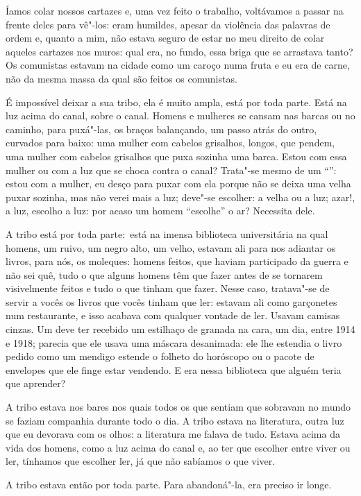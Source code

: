Íamos colar nossos cartazes e, uma vez feito o trabalho, voltávamos a
passar na frente deles para vê"-los: eram humildes, apesar da violência
das palavras de ordem e, quanto a mim, não estava seguro de estar no meu
direito de colar aqueles cartazes nos muros: qual era, no fundo, essa
briga que se arrastava tanto? Os comunistas estavam na cidade como um
caroço numa fruta e eu era de carne, não da mesma massa da qual são
feitos os comunistas.

É impossível deixar a sua tribo, ela é muito ampla, está por toda parte.
Está na luz acima do canal, sobre o canal. Homens e mulheres se cansam
nas barcas ou no caminho, para puxá"-las, os braços balançando, um passo
atrás do outro, curvados para baixo: uma mulher com cabelos grisalhos,
longos, que pendem, uma mulher com cabelos grisalhos que puxa sozinha
uma barca. Estou com essa mulher ou com a luz que se choca contra o
canal? Trata"-se mesmo de um ``'': estou com a mulher, eu desço para
puxar com ela porque não se deixa uma velha puxar sozinha, mas não verei
mais a luz; deve"-se escolher: a velha ou a luz; azar!, a luz, escolho a
luz: por acaso um homem ``escolhe'' o ar? Necessita dele.

A tribo está por toda parte:~está na imensa biblioteca universitária na
qual homens, um ruivo, um negro alto, um velho, estavam ali para nos
adiantar os livros, para nós, os moleques: homens feitos, que haviam
participado da guerra e não sei quê, tudo o que alguns homens têm que
fazer antes de se tornarem visivelmente feitos e tudo o que tinham que
fazer. Nesse caso, tratava"-se de servir a vocês os livros que vocês
tinham que ler: estavam ali como garçonetes num restaurante, e isso
acabava com qualquer vontade de ler. Usavam camisas cinzas. Um deve ter
recebido um estilhaço de granada na cara, um dia, entre 1914 e 1918;
parecia que ele usava uma máscara desanimada: ele lhe estendia o livro
pedido como um mendigo estende o folheto do horóscopo ou o pacote de
envelopes que ele finge estar vendendo. E era nessa biblioteca que
alguém teria que aprender?

A tribo estava nos bares nos quais todos os que sentiam que sobravam no
mundo se faziam companhia durante todo o dia. A tribo estava na
literatura, outra luz que eu devorava com os olhos: a literatura me
falava de tudo. Estava acima da vida dos homens, como a luz acima do
canal e, ao ter que escolher entre viver ou ler, tínhamos que escolher
ler, já que não sabíamos o que viver.

A tribo estava então por toda parte. Para abandoná"-la, era preciso ir
longe.

